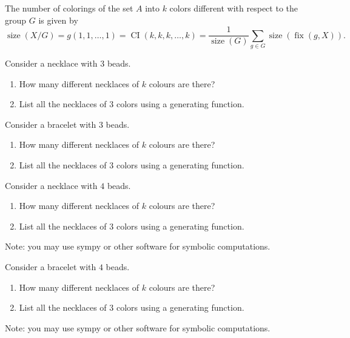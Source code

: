 \documentclass[12pt]{article}
\DeclareMathOperator{\size}{size}
\DeclareMathOperator{\fix}{fix}
\DeclareMathOperator{\CI}{CI}
\begin{document}
\begin{theorem}
   The number of colorings of the set $A$ into $k$ colors different with respect to the group $G$  is given by
    \[
    \size(X/G) = g(1, 1, \dots, 1) = \CI(k, k, k, \dots, k) =  \frac{1}{\size(G)} \sum_{g\in G}\size(\fix(g, X)).
    \]
\end{theorem}


\begin{exercise}
    Consider a necklace with $3$ beads.
    \begin{enumerate}[label=\alph*)]
        \item How many different necklaces of $k$ colours are there?
        \item List all the necklaces of $3$ colors using a generating function. 
    \end{enumerate}    
\end{exercise}

\begin{exercise}
    Consider a bracelet with $3$ beads.
    \begin{enumerate}[label=\alph*)]
        \item How many different necklaces of $k$ colours are there?
        \item List all the necklaces of $3$ colors using a generating function. 
    \end{enumerate}    
\end{exercise}



\begin{exercise}
    Consider a necklace with $4$ beads.
    \begin{enumerate}[label=\alph*)]
        \item How many different necklaces of $k$ colours are there?
        \item List all the necklaces of $3$ colors using a generating function. 
    \end{enumerate}    
    Note: you may use sympy or other software for symbolic computations.
\end{exercise}

\begin{exercise}
    Consider a bracelet with $4$ beads.
    \begin{enumerate}[label=\alph*)]
        \item How many different necklaces of $k$ colours are there?
        \item List all the necklaces of $3$ colors using a generating function. 
    \end{enumerate}    
    Note: you may use sympy or other software for symbolic computations.
\end{exercise}
\end{document}
